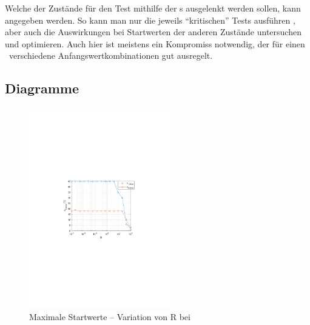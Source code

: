 Welche der Zustände für den Test mithilfe der \xots s ausgelenkt werden sollen, kann angegeben werden.
So kann man nur die jeweils "`kritischen"' Tests ausführen , aber auch die Auswirkungen bei Startwerten der anderen Zustände untersuchen und optimieren.
Auch hier ist meistens ein Kompromiss notwendig, der für einen \ap\ verschiedene Anfangswertkombinationen gut ausregelt.


\subsection{Diagramme}

\begin{figure}[htb]
	\centering
		\includegraphics[width=0.55\textwidth]{Bilder/QRVariation/ap2/R phi12.pdf}
	\caption{Maximale Startwerte -- Variation von R bei \apz}
	\label{fig:qrap2R}
\end{figure}


